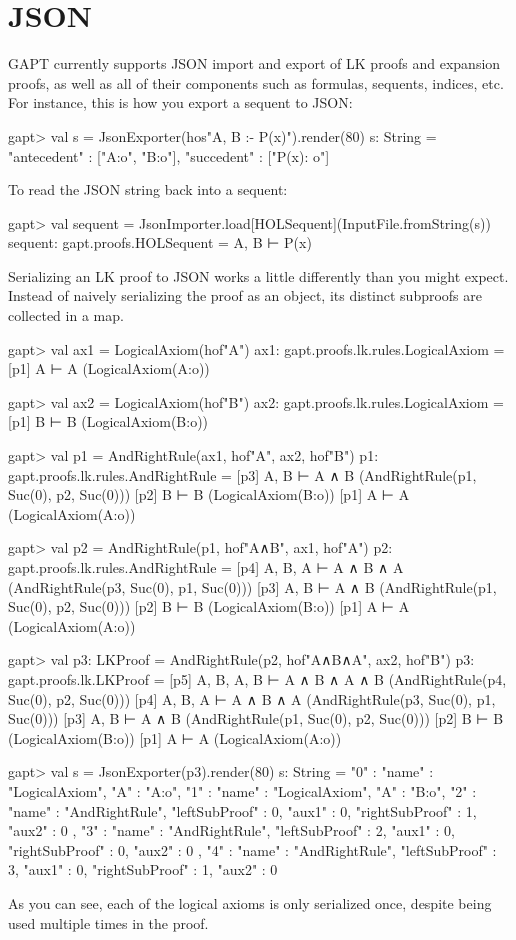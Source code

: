 \documentclass[a4paper,11pt]{book}
\begin{document}
\section{JSON}
GAPT currently supports JSON import and export of LK proofs and expansion proofs,
as well as all of their components such as formulas, sequents, indices, etc. For
instance, this is how you export a sequent to JSON:
\begin{clilisting}
gapt> val s = JsonExporter(hos"A, B :- P(x)").render(80)
s: String = {"antecedent" : ["A:o", "B:o"], "succedent" : ["P(x): o"]}

\end{clilisting}
To read the JSON string back into a sequent:
\begin{clilisting}
gapt> val sequent = JsonImporter.load[HOLSequent](InputFile.fromString(s))
sequent: gapt.proofs.HOLSequent = A, B ⊢ P(x)

\end{clilisting}
Serializing an LK proof to JSON works a little differently than you might
expect. Instead of naively serializing the proof as an object, its distinct
subproofs are collected in a map.
\begin{clilisting}
gapt> val ax1 = LogicalAxiom(hof"A")
ax1: gapt.proofs.lk.rules.LogicalAxiom =
[p1] A ⊢ A    (LogicalAxiom(A:o))

gapt> val ax2 = LogicalAxiom(hof"B")
ax2: gapt.proofs.lk.rules.LogicalAxiom =
[p1] B ⊢ B    (LogicalAxiom(B:o))

gapt> val p1 = AndRightRule(ax1, hof"A", ax2, hof"B")
p1: gapt.proofs.lk.rules.AndRightRule =
[p3] A, B ⊢ A ∧ B    (AndRightRule(p1, Suc(0), p2, Suc(0)))
[p2] B ⊢ B    (LogicalAxiom(B:o))
[p1] A ⊢ A    (LogicalAxiom(A:o))

gapt> val p2 = AndRightRule(p1, hof"A∧B", ax1, hof"A")
p2: gapt.proofs.lk.rules.AndRightRule =
[p4] A, B, A ⊢ A ∧ B ∧ A    (AndRightRule(p3, Suc(0), p1, Suc(0)))
[p3] A, B ⊢ A ∧ B    (AndRightRule(p1, Suc(0), p2, Suc(0)))
[p2] B ⊢ B    (LogicalAxiom(B:o))
[p1] A ⊢ A    (LogicalAxiom(A:o))

gapt> val p3: LKProof = AndRightRule(p2, hof"A∧B∧A", ax2, hof"B")
p3: gapt.proofs.lk.LKProof =
[p5] A, B, A, B ⊢ A ∧ B ∧ A ∧ B    (AndRightRule(p4, Suc(0), p2, Suc(0)))
[p4] A, B, A ⊢ A ∧ B ∧ A    (AndRightRule(p3, Suc(0), p1, Suc(0)))
[p3] A, B ⊢ A ∧ B    (AndRightRule(p1, Suc(0), p2, Suc(0)))
[p2] B ⊢ B    (LogicalAxiom(B:o))
[p1] A ⊢ A    (LogicalAxiom(A:o))

gapt> val s = JsonExporter(p3).render(80)
s: String =
{
  "0" : {"name" : "LogicalAxiom", "A" : "A:o"},
  "1" : {"name" : "LogicalAxiom", "A" : "B:o"},
  "2" : {
    "name" : "AndRightRule",
    "leftSubProof" : 0,
    "aux1" : 0,
    "rightSubProof" : 1,
    "aux2" : 0
  },
  "3" : {
    "name" : "AndRightRule",
    "leftSubProof" : 2,
    "aux1" : 0,
    "rightSubProof" : 0,
    "aux2" : 0
  },
  "4" : {
    "name" : "AndRightRule",
    "leftSubProof" : 3,
    "aux1" : 0,
    "rightSubProof" : 1,
    "aux2" : 0
  }
}

\end{clilisting}
As you can see, each of the logical axioms is only serialized once, despite being
used multiple times in the proof.
\end{document}
